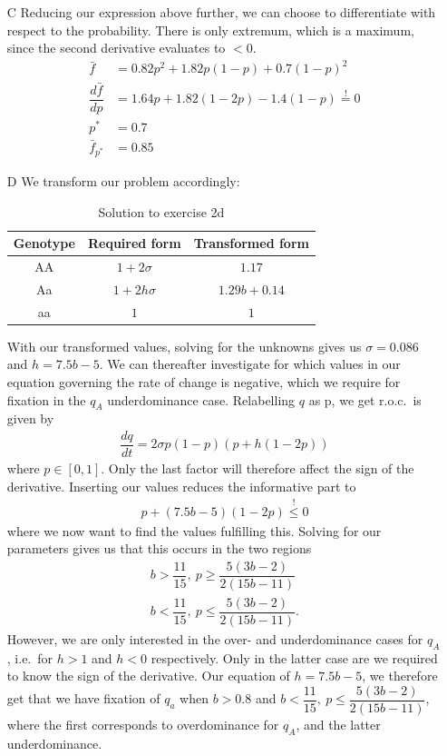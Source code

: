 \documentclass[10pt]{article}\usepackage[]{graphicx}\usepackage[]{color}
\theoremstyle{plain}
\begin{document}
\begin{multicols*}{2}
\begin{enumerate}
  \item[C] 
    Reducing our expression above further, we can choose to
    differentiate with respect to the probability. There is only extremum, which
    is a maximum, since the second derivative evaluates to $<0$.
    \begin{align*}
      \bar f &= 0.82p^2 + 1.82p(1-p) +
      0.7(1-p)^2 \\
      \dfrac{d\bar f}{dp} &= 1.64p + 1.82(1-2p) -
      1.4(1-p) \stackrel{!}{=} 0 \\
      p^* &= 0.7 \\
      \bar f_{p^*} &= 0.85
    \end{align*}
  \item[D] We transform our problem accordingly:
  \begin{table}[H]
     \centering
     \caption{Solution to exercise 2d}\label{tab:exc2d}
     \begin{tabular}{ccc}
       \toprule
       Genotype & Required form & Transformed form\\
       \midrule
     AA & $1 + 2\sigma$   & $1.17$ \\
     Aa & $1 + 2h\sigma$  & $1.29b + 0.14$ \\
     aa & $1$             & $1$ \\\bottomrule
     \end{tabular}
   \end{table}
   With our transformed values, solving for the unknowns gives us $\sigma = 0.086$ and $h = 7.5b - 5$. We can thereafter investigate for which values in our equation governing the rate of change is negative, which we require for fixation in the $q_A$ underdominance case. Relabelling $q$ as p, we get r.o.c.\ is given by 
   \begin{align*}
    \dfrac{dq}{dt} = 2\sigma p(1-p)(p + h(1-2p))
   \end{align*}
   where $p \in \left[0, 1\right]$. Only the last factor will therefore affect the sign of the derivative. Inserting our values reduces the informative part to
   \begin{align*}
      p + (7.5b - 5)(1 - 2p) \stackrel{!}{\leq} 0 
   \end{align*}
   where we now want to find the values fulfilling this. Solving for our parameters gives us that this occurs in the two regions    
   \begin{gather*}
      b > \dfrac{11}{15},\ p \geq \dfrac{5(3b-2)}{2(15b-11)} \\
      b < \dfrac{11}{15},\ p \leq \dfrac{5(3b-2)}{2(15b-11)}.
   \end{gather*}
   However, we are only interested in the over- and underdominance cases for $q_A$, i.e.\ for $h > 1$ and $h < 0$ respectively. Only in the latter case are we required to know the sign of the derivative. Our equation of $h = 7.5b - 5$, we therefore get that we have fixation of $q_a$ when $b > 0.8$ and $b < \dfrac{11}{15},\ p \leq \dfrac{5(3b-2)}{2(15b-11)}$, where the first corresponds to overdominance for $q_A$, and the latter underdominance.  


\end{enumerate}
\end{multicols*}
\end{document}
